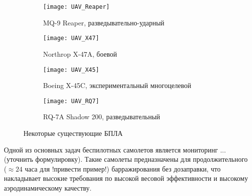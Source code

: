 \begin{figure}[H]
        \begin{subfigure}[b]{0.47\textwidth}
                \texttt{[image: UAV\_Reaper]}
                \caption{MQ-9 Reaper, разведывательно-ударный} %
                \label{fig:UAV_Reaper}
        \end{subfigure}%
        \hspace{\fill}
        \begin{subfigure}[b]{0.47\textwidth}
                \texttt{[image: UAV\_X47]}
                \caption{Northrop X-47A, боевой} %
                \label{fig:UAV_X47}
        \end{subfigure}%
        \hspace{\fill}\linebreak
        \begin{subfigure}[b]{0.47\textwidth}
                \texttt{[image: UAV\_X45]}
                \caption{Boeing X-45C, экспериментальный многоцелевой}
                \label{fig:UAV_X45}
        \end{subfigure}%
        \hspace{\fill}
        \begin{subfigure}[b]{0.47\textwidth}
                \texttt{[image: UAV\_RQ7]}
                \caption{RQ-7A Shadow 200, разведывательный}
                \label{fig:UAV_RQ7}
        \end{subfigure}
        \caption{Некоторые существующие БПЛА}\label{fig:UAVs}
\end{figure}



Одной из основных задач беспилотных самолетов является мониторинг ... (уточнить формулировку). Такие самолеты предназначены для продолжительного ($\approx24$ часа для !привести пример!) барражирования без дозаправки, что накладывает высокие требования по высокой весовой эффективности и высокому аэродинамическому качеству.

